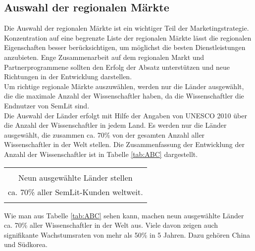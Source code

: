 \subsection{Auswahl der regionalen Märkte}
Die Auswahl der regionalen Märkte ist ein wichtiger Teil der Marketingstrategie. Konzentration auf eine begrenzte Liste der regionalen Märkte lässt die regionalen Eigenschaften besser berücksichtigen, um möglichst die besten Dienstleistungen anzubieten. Enge Zusammenarbeit auf dem regionalen Markt und Partnerprogrammene sollten den Erfolg der Absatz unterstützen und neue Richtungen in der Entwicklung darstellen.\\
Um richtige regionale Märkte auszuwählen, werden nur die Länder ausgewählt, die die maximale Anzahl der Wissenschaftler haben, da die Wissenschaftler die Endnutzer von SemLit sind. \\
Die Auswahl der Länder erfolgt mit Hilfe der Angaben von UNESCO 2010 über die Anzahl der Wissenschaftler in jedem Land. Es werden nur die Länder ausgewählt, die zusammen ca. 70\% von der gesamten Anzahl aller Wissenschaftler in der Welt stellen. Die Zusammenfassung der Entwicklung der Anzahl der Wissenschaftler ist in Tabelle \ref{tab:ABC} dargestellt.\\
\begin{table}[h!]
  \centering
  \begin{large}
  \begin{tabular}{c}\hline
  \\
  {\color{orange}Neun ausgewählte Länder stellen}\\
  {\color{orange}ca. 70\% aller SemLit-Kunden weltweit.}\\
  \\\hline
  \end{tabular}
  \end{large}
\end{table}
Wie man aus Tabelle \ref{tab:ABC} sehen kann, machen neun ausgewählte Länder ca. 70\% aller Wissenschaftler in der Welt aus. Viele davon zeigen auch signifikante Wachstumsraten von mehr als 50\% in 5 Jahren. Dazu gehören China und Südkorea.


